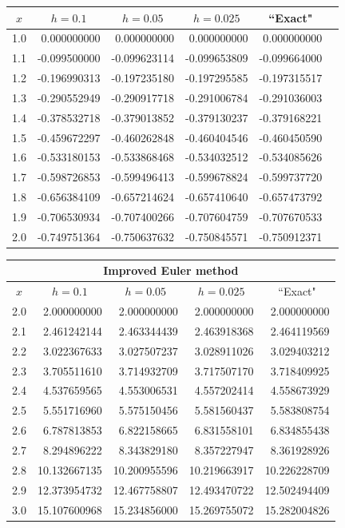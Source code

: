 \documentclass[dvips]{book}
\renewcommand{\exer}[1]{\par\medskip\;\noindent{\color{red}\bf #1.}}
\numberwithin{example}{section}
\numberwithin{equation}{section}
\numberwithin{theorem}{section}
\numberwithin{table}{section}
\numberwithin{figure}{section}
\begin{document}
\exer{3.2.12}
{\small
\begin{tabular}{|c|r|r|r|r|r|}
\hline
\multicolumn{1}{|c|}{$x$}&
\multicolumn{1}{|c|}{$h=0.1$}&
\multicolumn{1}{|c|}{$h=0.05$}&
\multicolumn{1}{|c|}{$h=0.025$}&
\multicolumn{1}{|c|}{``Exact"}\\ \hline
1.0 &  0.000000000 &  0.000000000 &  0.000000000 &  0.000000000 \\
1.1 & -0.099500000 & -0.099623114 & -0.099653809 & -0.099664000 \\
1.2 & -0.196990313 & -0.197235180 & -0.197295585 & -0.197315517 \\
1.3 & -0.290552949 & -0.290917718 & -0.291006784 & -0.291036003 \\
1.4 & -0.378532718 & -0.379013852 & -0.379130237 & -0.379168221 \\
1.5 & -0.459672297 & -0.460262848 & -0.460404546 & -0.460450590 \\
1.6 & -0.533180153 & -0.533868468 & -0.534032512 & -0.534085626 \\
1.7 & -0.598726853 & -0.599496413 & -0.599678824 & -0.599737720 \\
1.8 & -0.656384109 & -0.657214624 & -0.657410640 & -0.657473792 \\
1.9 & -0.706530934 & -0.707400266 & -0.707604759 & -0.707670533 \\
2.0 & -0.749751364 & -0.750637632 & -0.750845571 & -0.750912371 \\
\hline
\end{tabular}}

\exer{3.2.14}
{\small
\begin{tabular}{|c|r|r|r|r|}
\hline
\multicolumn{5}{|c|}{Improved Euler method}\\\hline
\multicolumn{1}{|c|}{$x$}&
\multicolumn{1}{|c|}{$h=0.1$}&
\multicolumn{1}{|c|}{$h=0.05$}&
\multicolumn{1}{|c|}{$h=0.025$}&
\multicolumn{1}{|c|}{``Exact"}\\ \hline
2.0 &  2.000000000 &  2.000000000 &  2.000000000 &  2.000000000 \\
2.1 &  2.461242144 &  2.463344439 &  2.463918368 &  2.464119569 \\
2.2 &  3.022367633 &  3.027507237 &  3.028911026 &  3.029403212 \\
2.3 &  3.705511610 &  3.714932709 &  3.717507170 &  3.718409925 \\
2.4 &  4.537659565 &  4.553006531 &  4.557202414 &  4.558673929 \\
2.5 &  5.551716960 &  5.575150456 &  5.581560437 &  5.583808754 \\
2.6 &  6.787813853 &  6.822158665 &  6.831558101 &  6.834855438 \\
2.7 &  8.294896222 &  8.343829180 &  8.357227947 &  8.361928926 \\
2.8 & 10.132667135 & 10.200955596 & 10.219663917 & 10.226228709 \\
2.9 & 12.373954732 & 12.467758807 & 12.493470722 & 12.502494409 \\
3.0 & 15.107600968 & 15.234856000 & 15.269755072 & 15.282004826 \\
\hline
\end{tabular}}
\end{document}
